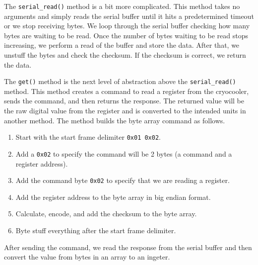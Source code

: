 The \texttt{serial\_read()} method is a bit more complicated.
This method takes no arguments and simply reads the serial buffer until it hits a predetermined timeout or we stop receiving bytes.
We loop through the serial buffer checking how many bytes are waiting to be read.
Once the number of bytes waiting to be read stops increasing, we perform a read of the buffer and store the data.
After that, we unstuff the bytes and check the checksum. 
If the checksum is correct, we return the data.  

The \texttt{get()} method is the next level of abstraction above the \texttt{serial\_read()} method.
This method creates a command to read a register from the cryocooler, sends the command, and then returns the response. 
The returned value will be the raw digital value from the register and is converted to the intended units in another method.
The method builds the byte array command as follows.
\begin{enumerate}
    \item Start with the start frame delimiter \texttt{0x01 0x02}.
    \item Add a \texttt{0x02} to specify the command will be 2 bytes (a command and a register address).
    \item Add the command byte \texttt{0x02} to specify that we are reading a register.
    \item Add the register address to the byte array in big endian format.
    \item Calculate, encode, and add the checksum to the byte array.
    \item Byte stuff everything after the start frame delimiter.
\end{enumerate}
After sending the command, we read the response from the serial buffer and then convert the value from bytes in an array to an ingeter. 

